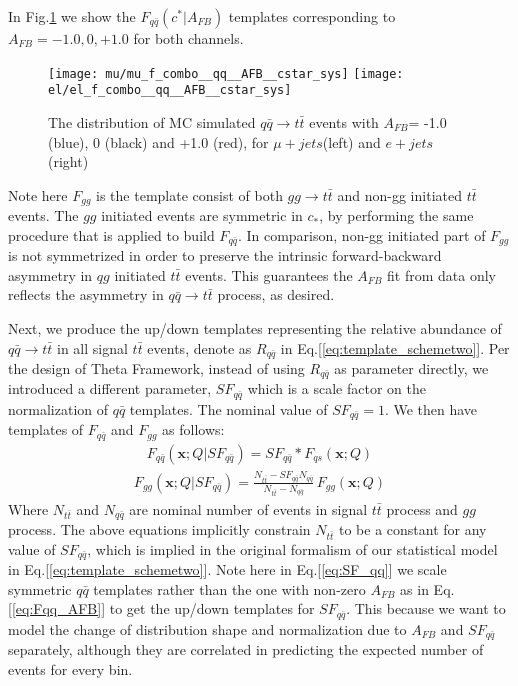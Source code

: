 In Fig.\ref{fig:AFB_templates} we show the $F_{q\bar{q}}(c^*|A_{FB})$ templates corresponding to $A_{FB}=-1.0,0,+1.0$ for both channels.

\begin{figure}[hbt]
  \begin{center}
    \texttt{[image: mu/mu\_f\_combo\_\_qq\_\_AFB\_\_cstar\_sys]}
    \texttt{[image: el/el\_f\_combo\_\_qq\_\_AFB\_\_cstar\_sys]}

  \caption{\small The distribution of MC simulated $q\bar{q}\rightarrow t\bar{t}$ events with $A_{FB}$= -1.0 (blue), 0 (black) and +1.0 (red), for $\mu+jets$(left) and $e+jets$(right)}
    \label{fig:AFB_templates}
  \end{center}
\end{figure}

Note here $F_{gg}$ is the template consist of both $gg\rightarrow t\bar{t}$ and non-gg initiated $t\bar{t}$ events. The $gg$ initiated events are symmetric in $c_*$, by performing the same procedure that is applied to build $F_{q\bar{q}}$. In comparison, non-gg initiated part of $F_{gg}$ is not symmetrized in order to preserve the intrinsic forward-backward asymmetry in $qg$ initiated $t\bar{t}$ events. This guarantees the $A_{FB}$ fit from data only reflects the asymmetry in $q\bar{q}\rightarrow t\bar{t}$ process, as desired. 

Next, we produce the up/down templates representing the relative abundance of $q\bar{q}\rightarrow t\bar{t}$ in all signal $t\bar{t}$ events, denote as $R_{q\bar{q}}$ in Eq.[\ref{eq:template_schemetwo}]. Per the design of Theta Framework, instead of using $R_{q\bar{q}}$ as parameter directly,  we introduced a different parameter, $SF_{q\bar{q}}$ which is a scale factor on the normalization of $q\bar{q}$ templates. The nominal value of $SF_{q\bar{q}} = 1$. We then have templates of $F_{q\bar{q}}$ and $F_{gg}$ as follows:
\begin{align}
\label{eq:SF_qq}
F_{q\bar{q}}(\bm{x};Q|SF_{q\bar{q}})=SF_{q\bar{q}} * F_{qs}(\bm{x};Q) 
\end{align}
\begin{align}
F_{gg}(\bm{x};Q|SF_{q\bar{q}})=\frac{N_{t\bar{t}}-SF_{q\bar{q}}N_{q\bar{q}}}{N_{t\bar{t}}-N_{q\bar{q}}}\, F_{gg}(\bm{x};Q)
\end{align} 
Where $N_{t\bar{t}}$ and $N_{q\bar{q}}$ are nominal number of events in signal $t\bar{t}$ process and $gg$ process. The above equations implicitly constrain $N_{t\bar{t}}$ to be a constant for any value of $SF_{q\bar{q}}$, which is implied in the original formalism of our statistical model in Eq.[\ref{eq:template_schemetwo}]. Note here in Eq.[\ref{eq:SF_qq}] we scale symmetric $q\bar{q}$ templates rather than the one with non-zero $A_{FB}$ as in Eq.[\ref{eq:Fqq_AFB}] to get the up/down templates for $SF_{q\bar{q}}$. This because we want to model the change of distribution shape and normalization due to $A_{FB}$ and $SF_{q\bar{q}}$ separately, although they are correlated in predicting the expected number of events for every bin. 

